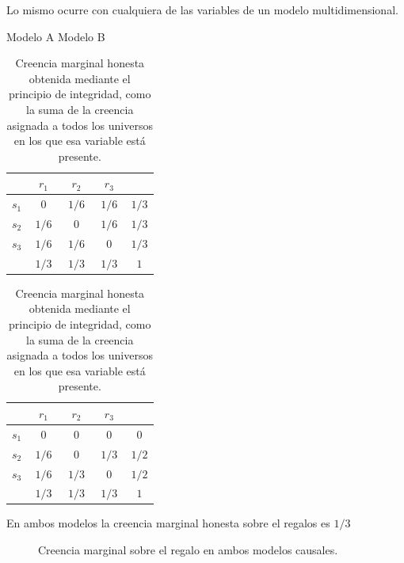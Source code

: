 \documentclass[a4paper,11pt]{book}
\theoremstyle{definition}
\begin{document}

Lo mismo ocurre con cualquiera de las variables de un modelo multidimensional.

\begin{table}[H]
\centering
Modelo A  \hspace{4.5cm}  Modelo B \\[0.1cm]
 \begin{tabular}{|c|c|c|c||c|} \hline \setlength\tabcolsep{0.4cm}
       & \, $r_1$ \, &  \, $r_2$ \, & \, $r_3$ \, & \\ \hline
  $s_1$ & $0$ & $1/6$ & $1/6$ & $1/3$ \\ \hline
  $s_2$ & $1/6$ & $0$ & $1/6$ & $1/3$ \\ \hline
  $s_3$ & $1/6$ & $1/6$ & $0$ & $1/3$ \\ \hline \hline
   & $1/3$ & $1/3$ & $1/3$ & $1$ \\ \hline
  \end{tabular}
  \hspace{1.5cm}
  \begin{tabular}{|c|c|c|c||c|} \hline  \setlength\tabcolsep{0.4cm}
 & \, $r_1$ \, &  \, $r_2$ \, & \, $r_3$ \, & \\ \hline
  $s_1$ & $0$ & $0$ & $0$ & $0$\\ \hline
  $s_2$ & $1/6$ & $0$ & $1/3$ & $1/2$ \\ \hline
  $s_3$ & $1/6$ & $1/3$ & $0$ & $1/2$ \\ \hline \hline
   & $1/3$ & $1/3$ & $1/3$ & $1$  \\ \hline
  \end{tabular}
  \caption{Creencia marginal honesta obtenida mediante el principio de integridad, como la suma de la creencia asignada a todos los universos en los que esa variable est\'a presente.}
  \label{tab:creencia_marginal}
\end{table}

En ambos modelos la creencia marginal honesta sobre el regalos es $1/3$
%
\begin{figure}[H]
\centering
{}
\caption{Creencia marginal sobre el regalo en ambos modelos causales. }
\end{figure}
\end{document}
